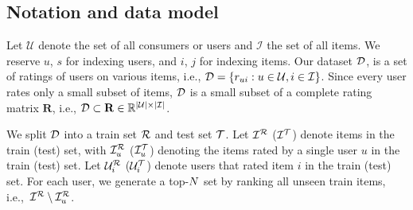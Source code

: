 
\subsection{Notation and data model}
\label{sec:Notation}

Let $\mathcal{U}$ denote the set of all consumers or users and $\mathcal{I}$ the set of all items.  We reserve $u$, $s$  for indexing users, and $i$, $j$ for indexing items. Our dataset $\dataset$, is a set of ratings of  users on various items, i.e.,  $\mathcal{D} = \{r_{ui}: u \in \mathcal{U}, i \in \mathcal{I} \}$. Since every user rates only a small subset of items, $\dataset$ is a small subset of a complete rating matrix $\mathbf{R}$, i.e., $\mathcal{D} \subset \mathbf{R} \in \mathbb{R}^{\vert \mathcal{U} \vert \times \vert \mathcal{I} \vert}$. 
  \iffalse
 We split $\dataset$ into a train set $\trainset$ and test set $\testset$, with $\itemsinTrainset$ denoting items in train, and $\itemsinTestset$ denoting items in test. 
   Let  $\itemsofUserinTrainset =\{ i: r_{ui} \in \trainset \}$ denote the items  rated by  user $u$ in the train set,  and $\usersofIteminTrainset =\{ u: r_{ui} \in \trainset \}$  denote users that rated item $i$ in the train set, with similar definitions for $\itemsofUserinTestset$ and $\usersofIteminTestset$.
   For each user, we  generate a top-$\size$ sets by  ranking all items that do not appear in the train set of that user, i.e., $\itemsinTrainset \setminus \itemsofUserinTrainset$).  
   \fi
   

 We split $\dataset$ into a train set $\trainset$ and test set $\testset$. Let  $\itemsinTrainset$ ($\itemsinTestset$) denote items in the train (test) set, with $\mathcal{I}_{u}^{\mathcal{R}}$ ($\itemsofUserinTestset$)  denoting the items rated by a single  user $u$ in the train (test) set.   Let  $\mathcal{U}_{i}^{\mathcal{R}}$  ($\usersofIteminTestset$) denote users that rated item $i$ in the train (test) set. For each user, we  generate a top-$\size$ set by  ranking all unseen train items, i.e.,~$\itemsinTrainset \setminus \itemsofUserinTrainset$.  

